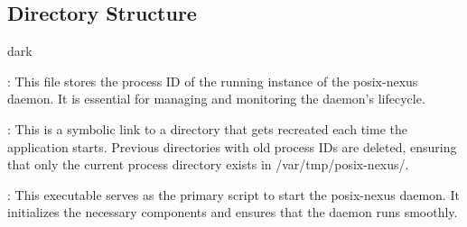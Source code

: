 \subsection{Directory Structure}
\label{sec:component:directorystructure}
\bigskip
\begin{baseBoxOne}{}{dark}
    \begin{posnexItemize}
        \item[\sA] : This file stores the process ID of the running instance of the posix-nexus daemon. It is essential for managing and monitoring the daemon's lifecycle.
        \item[\sA] : This is a symbolic link to a directory that gets recreated each time the application starts. Previous directories with old process IDs are deleted, ensuring that only the current process directory exists in /var/tmp/posix-nexus/.
        \item[\sA] : This executable serves as the primary script to start the posix-nexus daemon. It initializes the necessary components and ensures that the daemon runs smoothly.
    \end{posnexItemize}
\end{baseBoxOne}
\bigskip
